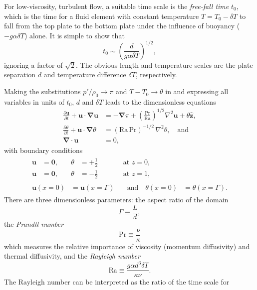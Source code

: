 \documentclass[titlepage,twoside]{article}
\numberwithin{equation}{section}
\newcommand{\pdiff}[2]{\frac{\partial #1}{\partial #2}}
\renewcommand\vec{\bm}
\newcommand{\uvec}[1]{\vec{\hat{#1}}}
\newcommand{\grad}{\vec{\nabla}}
\newcommand{\prandtl}{\ensuremath{\mathrm{Pr}}}
\newcommand{\rayleigh}{\ensuremath{\mathrm{Ra}}}
\begin{document}
For low-viscosity, turbulent flow, a suitable time scale is the
\emph{free-fall time} $t_0$, which is the time for a fluid element with
constant temperature $T = T_0 - \delta T$ to fall from the top plate to
the bottom plate under the influence of buoyancy ($-g \alpha \delta T$)
alone. It is simple to show that
\[
    t_0 \sim \left( \frac{d}{g \alpha \delta T} \right)^{1/2},
\]
ignoring a factor of $\sqrt{2}$. The obvious length and temperature
scales are the plate separation $d$ and temperature difference $\delta T$,
respectively.

Making the substitutions $p'/\rho_0 \to \pi$ and $T - T_0 \to \theta$
in  and expressing all
variables in units of $t_0$, $d$ and $\delta T$ leads to the dimensionless
equations
\begin{align}
    \label{eqn:momentum}
    \pdiff{\vec{u}}{t} + \vec{u} \cdot \grad \vec{u}
        &= -\grad \pi + \left( \frac{\prandtl}{\rayleigh}\right)^{1/2}
        \nabla^2 \vec{u} + \theta \uvec{z}, \\
    \label{eqn:energy}
    \pdiff{\theta}{t} + \vec{u} \cdot \grad \theta
        &= (\rayleigh\,\prandtl)^{-1/2} \, \nabla^2 \theta, \quad \text{and} \\
    \label{eqn:incompressible}
    \grad \cdot \vec{u} &= 0,
\end{align}
with boundary conditions
\begin{gather}
\begin{alignat}{3}
    \label{eqn:bc_bot}
    \vec{u} &= \vec{0}, &\quad \theta &= +\frac{1}{2}
    &\qquad& \text{at } z = 0, \\
    \label{eqn:bc_top}
    \vec{u} &= \vec{0}, &\quad \theta &= -\frac{1}{2}
    &\qquad& \text{at } z = 1,
\end{alignat} \\
\begin{alignat}{2}
    \label{eqn:bc_sides}
    \vec{u}(x=0) &= \vec{u}(x=\Gamma)
    &\quad \text{and} \quad \theta(x=0) &= \theta(x=\Gamma).
\end{alignat}
\end{gather}
There are three dimensionless parameters: the aspect ratio of the domain
\[
    \Gamma \equiv \frac{L}{d},
\]
the \emph{Prandtl number}
\[
    \prandtl \equiv \frac{\nu}{\kappa}
\]
which measures the relative importance of viscosity (momentum diffusivity)
and thermal diffusivity, and the \emph{Rayleigh number}
\[
    \rayleigh \equiv \frac{g \alpha d^3 \delta T}{\kappa \nu}.
\]
The Rayleigh number can be interpreted as the ratio of the time scale for
\end{document}
